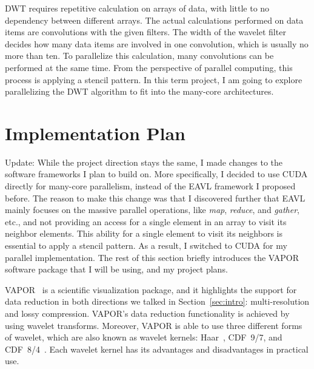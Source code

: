 \documentclass{article}
\begin{document}
DWT requires repetitive calculation on arrays of data, with little to no
dependency between different arrays.
%
The actual calculations performed on data items are convolutions
with the given filters. 
%
The width of the wavelet filter decides how many data items are 
involved in one convolution, which is usually no more than ten.
%
To parallelize this calculation, many convolutions can be performed
at the same time.
%
From the perspective of parallel computing, this process is applying
a stencil pattern.
%
%
In this term project, I am going to explore parallelizing the DWT algorithm 
to fit into the many-core architectures.


\section{Implementation Plan}
\label{sec:plan}
%
Update: 
%
While the project direction stays the same, I made changes to the 
software frameworks I plan to build on.
%
More specifically, I decided to use CUDA directly for many-core parallelism,
instead of the EAVL framework I proposed before.
%
The reason to make this change was that I discovered further that EAVL 
mainly focuses on the massive parallel operations, like \textit{map}, 
\textit{reduce}, and \textit{gather}, etc.,
and not providing an access for a single element in an array to visit
its neighbor elements.
%
This ability for a single element to visit its neighbors is essential
to apply a stencil pattern.
%
As a result, I switched to CUDA for my parallel implementation.
%
The rest of this section briefly introduces the VAPOR software package that
I will be using, and my project plans.



VAPOR~\cite{clyne2007interactive}
is a scientific visualization package, and it highlights the 
support for data reduction in both directions we talked in
Section~\ref{sec:intro}: multi-resolution and lossy compression.
%
VAPOR's data reduction functionality is achieved by using wavelet transforms.
%
Moreover, VAPOR is able to use three different forms of wavelet, which 
are also known as wavelet kernels: Haar~\cite{haar1910theorie}, 
CDF~9/7, and CDF~8/4~\cite{cohen1992biorthogonal}.
%
Each wavelet kernel has its advantages and disadvantages in practical use.
\end{document}
